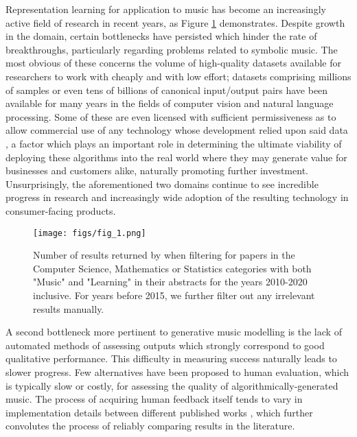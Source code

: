 \documentclass{article}
\begin{document}
Representation learning for application to music has become an increasingly active field of research in recent years, as Figure \ref{fig:musicai} demonstrates. Despite growth in the domain, certain bottlenecks have persisted which hinder the rate of breakthroughs, particularly regarding problems related to symbolic music. The most obvious of these concerns the volume of high-quality datasets available for researchers to work with cheaply and with low effort; datasets comprising millions of samples \cite{imagenet} or even tens of billions of canonical input/output pairs \cite{books} have been available for many years in the fields of computer vision and natural language processing. Some of these are even licensed with sufficient permissiveness as to allow commercial use of any technology whose development relied upon said data \cite{openimages}, a factor which plays an important role in determining the ultimate viability of deploying these algorithms into the real world where they may generate value for businesses and customers alike, naturally promoting further investment. Unsurprisingly, the aforementioned two domains continue to see incredible progress in research and increasingly wide adoption of the resulting technology in consumer-facing products.

\begin{figure}
 \centerline{
 \texttt{[image: figs/fig\_1.png]}}
 \caption{Number of results returned by \cite{arxiv} when filtering for papers in the Computer Science, Mathematics or Statistics categories with both "Music" and "Learning" in their abstracts for the years 2010-2020 inclusive. For years before 2015, we further filter out any irrelevant results manually.}
 \label{fig:musicai}
\end{figure}

A second bottleneck more pertinent to generative music modelling is the lack of automated methods of assessing outputs which strongly correspond to good qualitative performance. This difficulty in measuring success naturally leads to slower progress. Few alternatives have been proposed to human evaluation, which is typically slow or costly, for assessing the quality of algorithmically-generated music. The process of acquiring human feedback itself tends to vary in implementation details between different published works \cite{deepbach, bachbot, coconet}, which further convolutes the process of reliably comparing results in the literature.
\end{document}
